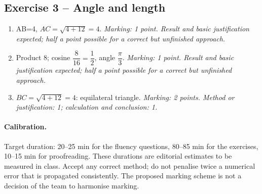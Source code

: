 \subsection*{Exercise 3 -- Angle and length}
\begin{enumerate}
\item AB=4, $AC=\sqrt{4+12}=4$. \textit{Marking: 1 point. Result and basic justification expected; half a point possible for a correct but unfinished approach.}
\item Product 8; cosine $\dfrac{8}{16}=\dfrac{1}{2}$, angle $\dfrac{\pi}{3}$. \textit{Marking: 1 point. Result and basic justification expected; half a point possible for a correct but unfinished approach.}
\item $BC=\sqrt{4+12}=4$: equilateral triangle. \textit{Marking: 2 points. Method or justification: 1; calculation and conclusion: 1.}
\end{enumerate}
\paragraph{Calibration.} Target duration: 20--25 min for the fluency questions, 80--85 min for the exercises, 10--15 min for proofreading. These durations are editorial estimates to be measured in class. Accept any correct method; do not penalise twice a numerical error that is propagated consistently. The proposed marking scheme is not a decision of the team to harmonise marking.
